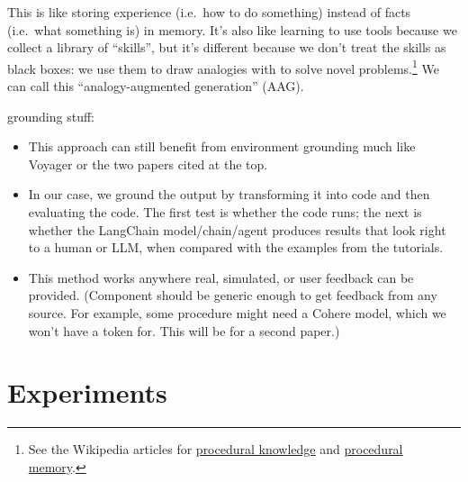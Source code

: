 \documentclass{article}
\begin{document}
This is like storing experience (i.e.~how to do something) instead of facts (i.e.~what something is) in memory. It's also like learning to use tools because we collect a library of ``skills'', but it's different because we don't treat the skills as black boxes: we use them to draw analogies with to solve novel problems.\footnote{See the Wikipedia articles for \href{https://en.wikipedia.org/wiki/Procedural\_knowledge}{procedural knowledge} and \href{https://en.wikipedia.org/wiki/Procedural\_memory}{procedural memory}.} We can call this ``analogy-augmented generation'' (AAG).

grounding stuff:
\begin{itemize}
   \item This approach can still benefit from environment grounding much like Voyager or the two papers cited at the top.
   \item In our case, we ground the output by transforming it into code and then evaluating the code. The first test is whether the code runs; the next is whether the LangChain model/chain/agent produces results that look right to a human or LLM, when compared with the examples from the tutorials.
   \item This method works anywhere real, simulated, or user feedback can be provided. (Component should be generic enough to get feedback from any source. For example, some procedure might need a Cohere model, which we won't have a token for. This will be for a second paper.)
\end{itemize}

\section{Experiments}
\end{document}
